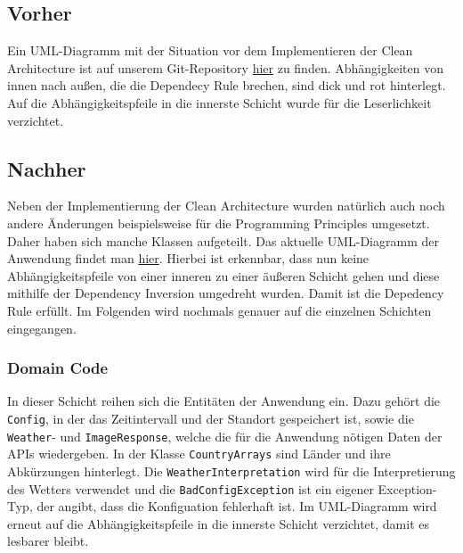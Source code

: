 \subsection{Vorher}\label{CleanArchitectureVorher}
Ein UML-Diagramm mit der Situation vor dem Implementieren der Clean Architecture ist auf unserem Git-Repository \href{https://github.com/Bronzila/WeatherWallpaper/blob/master/CleanArchitecturePics/Architektur_Vorher.jpg}{\color{blue}hier} zu finden. Abhängigkeiten von innen nach außen, die die Dependecy Rule brechen, sind dick und rot hinterlegt. Auf die Abhängigkeitspfeile in die innerste Schicht wurde für die Leserlichkeit verzichtet.
\subsection{Nachher}
Neben der Implementierung der Clean Architecture wurden natürlich auch noch andere Änderungen beispielsweise für die Programming Principles umgesetzt. Daher haben sich manche Klassen aufgeteilt. Das aktuelle UML-Diagramm der Anwendung findet man \href{https://github.com/Bronzila/WeatherWallpaper/blob/master/CleanArchitecturePics/Architektur_Vorher.jpg}{\color{blue}hier}. Hierbei ist erkennbar, dass nun keine Abhängigkeitspfeile von einer inneren zu einer äußeren Schicht gehen und diese mithilfe der Dependency Inversion umgedreht wurden. Damit ist die Depedency Rule erfüllt. Im Folgenden wird nochmals genauer auf die einzelnen Schichten eingegangen.
\subsubsection{Domain Code}
In dieser Schicht reihen sich die Entitäten der Anwendung ein. Dazu gehört die \texttt{Config}, in der das Zeitintervall und der Standort gespeichert ist, sowie die \texttt{Weather}- und \texttt{ImageResponse}, welche die für die Anwendung nötigen Daten der APIs wiedergeben. In der Klasse \texttt{CountryArrays} sind Länder und ihre Abkürzungen hinterlegt. Die \texttt{WeatherInterpretation} wird für die Interpretierung des Wetters verwendet und die \texttt{BadConfigException} ist ein eigener Exception-Typ, der angibt, dass die Konfiguation fehlerhaft ist. Im UML-Diagramm wird erneut auf die Abhängigkeitspfeile in die innerste Schicht verzichtet, damit es lesbarer bleibt.
